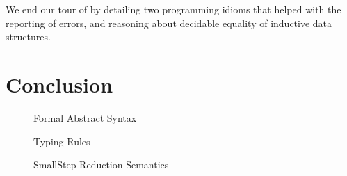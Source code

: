 \documentclass[%
draft, %
a4paper,
UKenglish,
cleveref,
autoref,
thm-restate,
pdfa
]{oasics-v2021}
\begin{document}
We end our tour of \Velo{} by detailing two programming idioms that helped with the reporting of errors, and reasoning about decidable equality of inductive data structures.




\section{Conclusion}
\label{sec:conclusion}

\newpage


\newpage
\appendix

\begin{figure}[ht]
  \centering
  
  \caption{\label{fig:velo:syntax}\Velo{} Formal Abstract Syntax}
\end{figure}

\begin{figure}[ht]
  \centering
  
  \caption{\label{fig:velo:statics}\Velo{} Typing Rules}
\end{figure}

\begin{figure}[ht]
  \centering
  
  \caption{\label{fig:velo:statics}\Velo{} SmallStep Reduction Semantics}
\end{figure}
\end{document}
